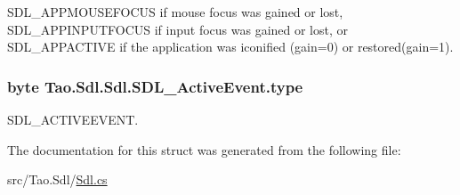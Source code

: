 SDL\_\-APPMOUSEFOCUS if mouse focus was gained or lost, SDL\_\-APPINPUTFOCUS if input focus was gained or lost, or SDL\_\-APPACTIVE if the application was iconified (gain=0) or restored(gain=1). 

\hypertarget{struct_tao_1_1_sdl_1_1_sdl_1_1_s_d_l___active_event_a3ccdb2d70afdc19618061c6d5b28356a}{
\subsubsection[{type}]{\setlength{\rightskip}{0pt plus 5cm}byte {\bf Tao.Sdl.Sdl.SDL\_\-ActiveEvent.type}}}
\label{struct_tao_1_1_sdl_1_1_sdl_1_1_s_d_l___active_event_a3ccdb2d70afdc19618061c6d5b28356a}


SDL\_\-ACTIVEEVENT. 



The documentation for this struct was generated from the following file:\begin{DoxyCompactItemize}
\item 
src/Tao.Sdl/\hyperlink{_sdl_8cs}{Sdl.cs}\end{DoxyCompactItemize}
